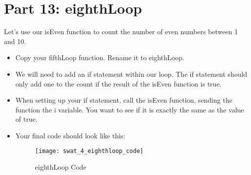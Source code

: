 \documentclass{article}
\begin{document}
\section*{Part 13: eighthLoop}
Let's use our isEven function to count the number of even numbers between 1 and 10.
\begin{itemize}
	\item Copy your fifthLoop function.  Rename it to eighthLoop.
	\item We will need to add an if statement within our loop.  The if statement should only add one to the count if the result of the isEven function is true.
	\item When setting up your if statement, call the isEven function, sending the function the i variable. You want to see if it is exactly the same as the value of true.
	\item Your final code should look like this:
	\begin{figure}[H]
  		\centering
  		\texttt{[image: swat\_4\_eighthloop\_code]}
  		\caption{eighthLoop Code}
	\end{figure}
\end{itemize}
\end{document}
